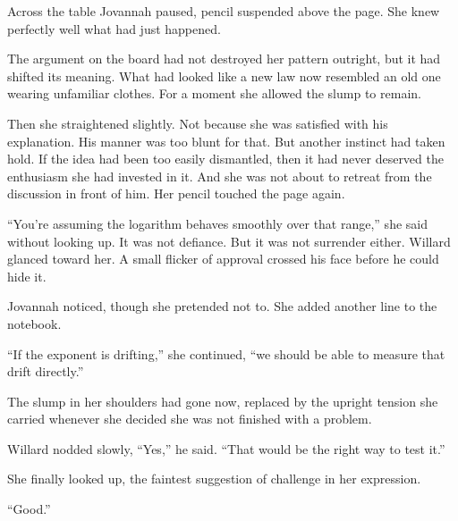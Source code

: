 Across the table Jovannah paused, pencil suspended above the page. She knew perfectly well what had just happened.

The argument on the board had not destroyed her pattern outright, but it had shifted its meaning. What had looked like a new law now resembled an old one wearing unfamiliar clothes. For a moment she allowed the slump to remain.

Then she straightened slightly. Not because she was satisfied with his explanation. His manner was too blunt for that. But another instinct had taken hold. If the idea had been too easily dismantled, then it had never deserved the enthusiasm she had invested in it. And she was not about to retreat from the discussion in front of him. Her pencil touched the page again.

``You're assuming the logarithm behaves smoothly over that range,'' she said without looking up. It was not defiance. But it was not surrender either. Willard glanced toward her. A small flicker of approval crossed his face before he could hide it.

Jovannah noticed, though she pretended not to. She added another line to the notebook.

``If the exponent is drifting,'' she continued, ``we should be able to measure that drift directly.''

The slump in her shoulders had gone now, replaced by the upright tension she carried whenever she decided she was not finished with a problem.

Willard nodded slowly, ``Yes,'' he said. ``That would be the right way to test it.''

She finally looked up, the faintest suggestion of challenge in her expression.

``Good.''

